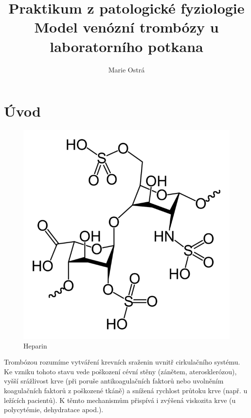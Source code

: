 \documentclass[12pt]{article}
\begin{document}
\title{Praktikum z patologické fyziologie \\
Model venózní trombózy u laboratorního potkana}
\author{Marie Ostrá}
\maketitle

\section{Úvod}

\begin{figure}
  \vspace{-20pt}
  \begin{center}
	\includegraphics[width=\linewidth]{heparin.png}
	\caption{Heparin}
  \end{center}
  \vspace{-20pt}
\end{figure}

Trombózou rozumíme vytváření krevních sraženin uvnitř cirkulačního systému. Ke vzniku tohoto
stavu vede poškození cévní stěny (zánětem, aterosklerózou), vyšší srážlivost krve (při poruše
antikoagulačních faktorů nebo uvolněním koagulačních faktorů z poškozené tkáně) a snížená
rychlost průtoku krve (např. u ležících pacientů). K těmto mechanismům přispívá i zvýšená
viskozita krve (u polycytémie, dehydratace apod.).
\end{document}
